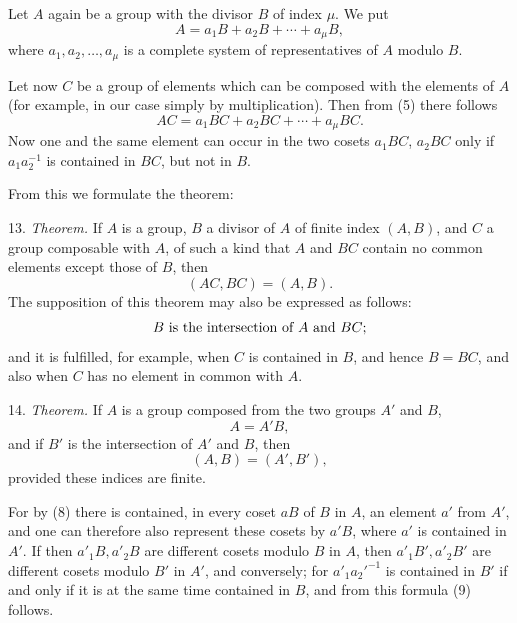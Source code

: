 \documentclass[11pt]{article}
\begin{document}
Let \(A\) again be a group with the divisor \(B\) of index \(\mu\). We put
\begin{equation}
 A=a_1B+a_2B+\cdots+a_\mu B,
\tag{5}
\end{equation}
where \(a_1,a_2,\ldots,a_\mu\) is a complete system of representatives of \(A\) modulo \(B\).

Let now \(C\) be a group of elements which can be composed with the elements of \(A\) (for example, in our case simply by multiplication). Then from (5) there follows
\begin{equation}
 AC=a_1BC+a_2BC+\cdots+a_\mu BC.
\tag{6}
\end{equation}
Now one and the same element can occur in the two cosets \(a_1BC\), \(a_2BC\) only if \(a_1a_2^{-1}\) is contained in \(BC\), but not in \(B\).

From this we formulate the theorem:

13. \emph{Theorem.} If \(A\) is a group, \(B\) a divisor of \(A\) of finite index \((A,B)\), and \(C\) a group composable with \(A\), of such a kind that \(A\) and \(BC\) contain no common elements except those of \(B\), then
\begin{equation}
 (AC,BC)=(A,B).
\tag{7}
\end{equation}
The supposition of this theorem may also be expressed as follows:
\[
 B\hbox{ is the intersection of }A\hbox{ and }BC;
\]
and it is fulfilled, for example, when \(C\) is contained in \(B\), and hence \(B=BC\), and also when \(C\) has no element in common with \(A\).

14. \emph{Theorem.} If \(A\) is a group composed from the two groups \(A'\) and \(B\),
\begin{equation}
 A=A'B,
\tag{8}
\end{equation}
and if \(B'\) is the intersection of \(A'\) and \(B\), then
\begin{equation}
 (A,B)=(A',B'),
\tag{9}
\end{equation}
provided these indices are finite.

For by (8) there is contained, in every coset \(aB\) of \(B\) in \(A\), an element \(a'\) from \(A'\), and one can therefore also represent these cosets by \(a'B\), where \(a'\) is contained in \(A'\). If then \(a'_1B,a'_2B\) are different cosets modulo \(B\) in \(A\), then \(a'_1B',a'_2B'\) are different cosets modulo \(B'\) in \(A'\), and conversely; for \(a'_1a_2'^{-1}\) is contained in \(B'\) if and only if it is at the same time contained in \(B\), and from this formula (9) follows.
\end{document}
